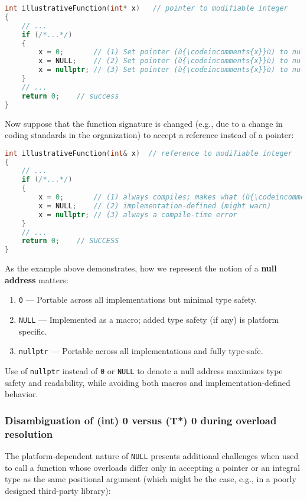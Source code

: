 \begin{lstlisting}[language=C++]
int illustrativeFunction(int* x)   // pointer to modifiable integer
{
    // ...
    if (/*...*/)
    {
        x = 0;       // (1) Set pointer (ù{\codeincomments{x}}ù) to null address.
        x = NULL;    // (2) Set pointer (ù{\codeincomments{x}}ù) to null address.
        x = nullptr; // (3) Set pointer (ù{\codeincomments{x}}ù) to null address.
    }
    // ...
    return 0;    // success
}
\end{lstlisting}
    

Now suppose that the function signature is changed (e.g., due to a
change in coding standards in the organization) to accept a reference
instead of a pointer:

\begin{lstlisting}[language=C++]
int illustrativeFunction(int& x)  // reference to modifiable integer
{
    // ...
    if (/*...*/)
    {
        x = 0;       // (1) always compiles; makes what (ù{\codeincomments{x}}ù) refers to 0
        x = NULL;    // (2) implementation-defined (might warn)
        x = nullptr; // (3) always a compile-time error
    }
    // ...
    return 0;    // SUCCESS
}
\end{lstlisting}
    

As the example above demonstrates, how we represent the notion of a
\textbf{null address} matters:
\begin{enumerate}
\item{\texttt{0} — Portable across all implementations but minimal type safety.}
\item{\texttt{NULL} — Implemented as a macro; added type safety (if any) is platform specific.}
\item{\texttt{nullptr} — Portable across all implementations and fully type-safe.}
\end{enumerate}
Use of \texttt{nullptr} instead of \texttt{0} or \texttt{NULL} to denote
a null address maximizes type safety and readability, while avoiding
both macros and implementation-defined behavior.

\subsubsection[Disambiguation of \tt{(int) 0} versus \tt{(T*) 0} during overload resolution]{Disambiguation of {\ParaCode (int) 0} versus {\ParaCode (T*) 0} during overload resolution}\label{disambiguation-of-(int)-0-versus-(t*)-0-during-overload-resolution}

The platform-dependent nature of \texttt{NULL} presents additional
challenges when used to call a function whose overloads differ only in
accepting a pointer or an integral type as the same positional argument
(which might be the case, e.g., in a poorly designed third-party
library):

